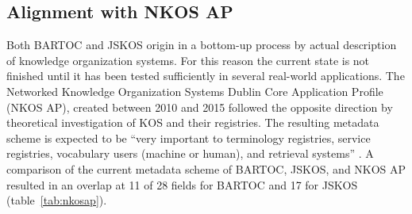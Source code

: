 \documentclass[12pt,a4paper]{llncs}
\begin{document}
\subsection{Alignment with NKOS AP}

Both BARTOC and JSKOS origin in a bottom-up process by actual description of knowledge organization systems. For this reason the current state is not finished until it has been tested sufficiently in several real-world applications. The Networked Knowledge Organization Systems Dublin Core Application Profile (NKOS AP), created between 2010 and 2015 followed the opposite direction by theoretical investigation of KOS and their registries. The resulting metadata scheme is expected to be ``very important to terminology registries, service registries, vocabulary users (machine or human), and retrieval systems'' \cite{zeng2015nkos}. 
A comparison of the current metadata scheme of BARTOC, JSKOS, and NKOS AP resulted in an overlap at 11 of 28 fields for BARTOC and 17 for JSKOS (table~\ref{tab:nkosap}).
\end{document}
